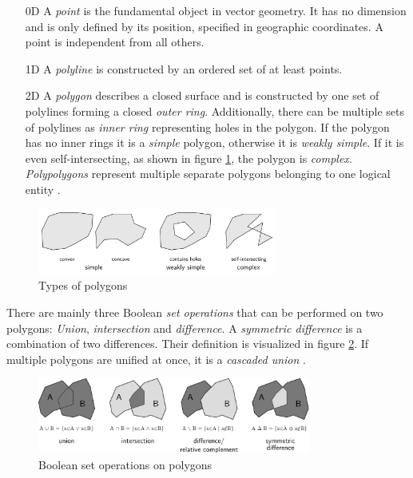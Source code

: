 \begin{enumerate}
  \item[0D] A \emph{point} is the fundamental object in vector geometry. It has no dimension and is only defined by its position, specified in geographic coordinates. A point is independent from all others.
  \item[1D] A \emph{polyline} is constructed by an ordered set of at least points.
  \item[2D] A \emph{polygon} describes a closed surface and is constructed by one set of polylines forming a closed \emph{outer ring}. Additionally, there can be multiple sets of polylines as \emph{inner ring} representing holes in the polygon. If the polygon has no inner rings it is a \emph{simple} polygon, otherwise it is \emph{weakly simple}. If it is even self-intersecting, as shown in figure \ref{fig:polygon_properties}, the polygon is \emph{complex}. \emph{Polypolygons} represent multiple separate polygons belonging to one logical entity \cite{polygons}.
\end{enumerate}

\begin{figure}[H]
  \centering
  \includegraphics[width=0.7\textwidth]{graphics/basics/hgis/polygon_properties}
  \caption{Types of polygons}
  \label{fig:polygon_properties}
\end{figure}

There are mainly three Boolean \emph{set operations} that can be performed on two polygons: \emph{Union}, \emph{intersection} and \emph{difference}. A \emph{symmetric difference} is a combination of two differences. Their definition is visualized in figure \ref{fig:polygon_operations}.
If multiple polygons are unified at once, it is a \emph{cascaded union}
\cite{bolstad2008gis}.

\begin{figure}[ht]
  \centering
  \includegraphics[width=0.8\textwidth]{graphics/basics/hgis/polygon_operations}
  \caption{Boolean set operations on polygons}
  \label{fig:polygon_operations}
\end{figure}

